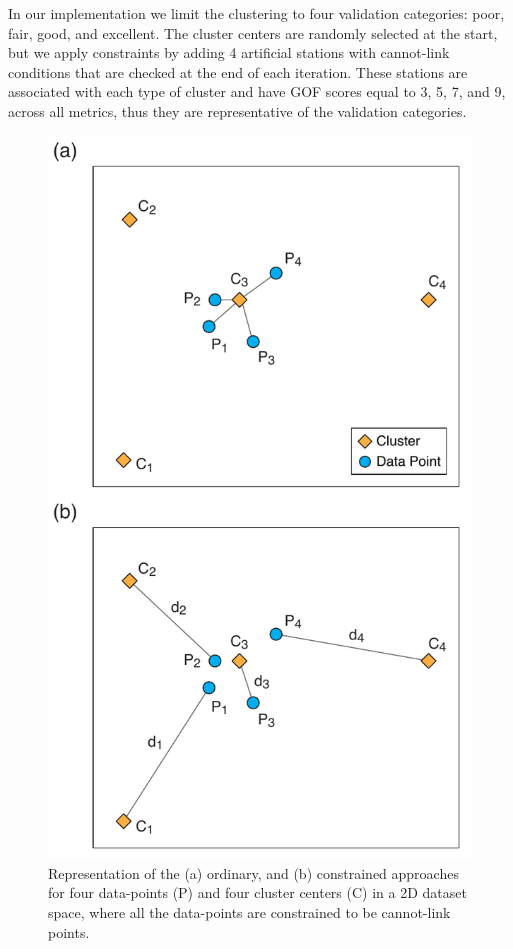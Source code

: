 In our implementation we limit the clustering to four validation categories: poor, fair, good, and excellent. The cluster centers are randomly selected at the start, but we apply constraints by adding 4 artificial stations with cannot-link conditions that are checked at the end of each iteration. These stations are associated with each type of cluster and have GOF scores equal to 3, 5, 7, and 9, across all metrics, thus they are representative of the validation categories. 

\begin{figure}[t]
	\centering
	\includegraphics[width=\columnwidth]{figures/pdf/figure-04}
	\caption{Representation of the (a) ordinary, and (b) constrained \kmeans{} approaches for four data-points (P) and four cluster centers (C) in a 2D dataset space, where all the data-points are constrained to be cannot-link points. }
	\label{fig:k-means}
\end{figure}

